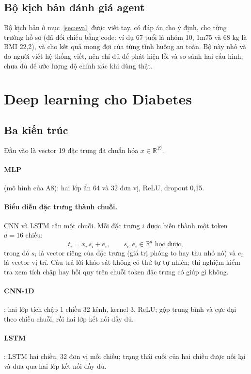 \documentclass[11pt,a4paper]{article}
\begin{document}
\subsection{Bộ kịch bản đánh giá agent}

Bộ kịch bản ở mục~\ref{sec:eval} được viết tay, có đáp án cho ý định, cho từng trường hồ sơ (đã đối chiếu bằng code: ví dụ
67 tuổi là nhóm 10, 1m75 và 68 kg là BMI 22,2), và cho kết quả mong đợi của từng tình huống an toàn. Bộ này nhỏ và do người
viết hệ thống viết, nên chỉ đủ để phát hiện lỗi và so sánh hai cấu hình, chưa đủ để ước lượng độ chính xác khi dùng thật.

\section{Deep learning cho Diabetes}
\label{sec:dl}

\subsection{Ba kiến trúc}

Đầu vào là vector 19 đặc trưng đã chuẩn hóa $x \in \mathbb{R}^{19}$.

\paragraph{MLP} (mô hình của A8): hai lớp ẩn 64 và 32 đơn vị, ReLU, dropout 0,15.

\paragraph{Biểu diễn đặc trưng thành chuỗi.}
CNN và LSTM cần một chuỗi. Mỗi đặc trưng $i$ được biến thành một token $d = 16$ chiều:
\[ t_i = x_i \, s_i + e_i, \qquad s_i, e_i \in \mathbb{R}^{d} \text{ học được}, \]
trong đó $s_i$ là vector riêng của đặc trưng (giá trị phóng to hay thu nhỏ nó) và $e_i$ là vector vị trí. Câu trả lời khảo sát
không có thứ tự tự nhiên; thí nghiệm kiểm tra xem tích chập hay hồi quy trên chuỗi token đặc trưng có giúp gì không.

\paragraph{CNN-1D}: hai lớp tích chập 1 chiều 32 kênh, kernel 3, ReLU; gộp trung bình và cực đại theo chiều chuỗi, rồi hai
lớp kết nối đầy đủ.

\paragraph{LSTM}: LSTM hai chiều, 32 đơn vị mỗi chiều; trạng thái cuối của hai chiều được nối lại và đưa qua hai lớp kết nối
đầy đủ.
\end{document}
